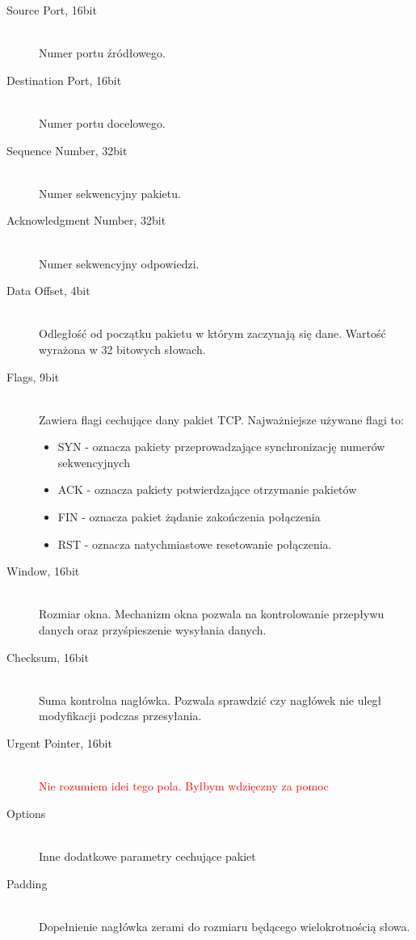 \documentclass[a4paper,12pt,oneside]{book}
\begin{document}
			\begin{description}
			\item[Source Port, 16bit]\hfill \\
				Numer portu źródłowego.
			\item[Destination Port, 16bit]\hfill \\
				Numer portu docelowego.
			\item[Sequence Number, 32bit]\hfill \\
				Numer sekwencyjny pakietu.
			\item[Acknowledgment Number, 32bit]\hfill \\
				Numer sekwencyjny odpowiedzi.	
			\item[Data Offset, 4bit]\hfill \\
				Odległość od początku pakietu w którym zaczynają się dane.
				Wartość wyrażona w 32 bitowych słowach.
			\item[Flags, 9bit]\hfill \\
				Zawiera flagi cechujące dany pakiet TCP.
				Najważniejsze używane flagi to:
				\begin{itemize}
					\item SYN - oznacza pakiety przeprowadzające synchronizację numerów sekwencyjnych
					\item ACK - oznacza pakiety potwierdzające otrzymanie pakietów
					\item FIN - oznacza pakiet żądanie zakończenia połączenia
					\item RST - oznacza natychmiastowe resetowanie połączenia.
				\end{itemize}
			\item[Window, 16bit]\hfill \\
				Rozmiar okna. Mechanizm okna pozwala na kontrolowanie przepływu danych oraz przyśpieszenie wysyłania danych.
			\item[Checksum, 16bit]\hfill \\
				Suma kontrolna nagłówka. Pozwala sprawdzić czy nagłówek nie uległ modyfikacji podczas przesyłania.
			\item[Urgent Pointer, 16bit]\hfill\\
				\textcolor{red}{\Large{Nie rozumiem idei tego pola. Byłbym wdzięczny za pomoc}}
			\item[Options]\hfill\\
				Inne dodatkowe parametry cechujące pakiet
			\item[Padding]\hfill\\
				Dopełnienie nagłówka zerami do rozmiaru będącego wielokrotnością słowa.
			\end{description}
\end{document}
